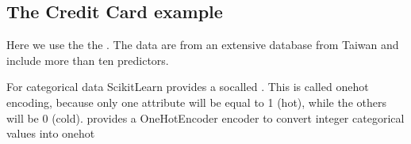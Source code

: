 \documentclass[letterpaper,10pt,english]{sphinxmanual}
\begin{document}
\begin{sphinxVerbatim}[commandchars=\\\{\}]
  
      
     
     


 
       
       
      

   
\end{sphinxVerbatim}

\noindent{}


\subsection{The Credit Card example}
\label{\detokenize{chapter5:the-credit-card-example}}
Here we use the the .
The data are from an extensive database from Taiwan and include more than ten predictors.

For categorical data \sphinxhyphen{}Scikit\sphinxhyphen{}Learn\sphinxhyphen{} provides a so\sphinxhyphen{}called .
This is called one\sphinxhyphen{}hot
encoding, because only one attribute will be equal to 1 (hot), while the others will be 0 (cold).
 provides a OneHotEncoder encoder to convert integer categorical values into one\sphinxhyphen{}hot

\begin{sphinxVerbatim}[commandchars=\\\{\}]
   
  
\end{sphinxVerbatim}
\end{document}
